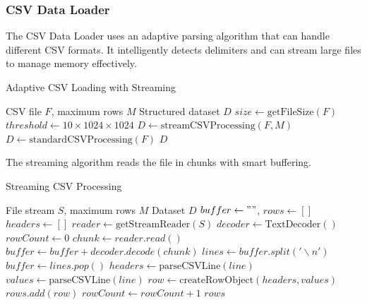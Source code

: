 \documentclass[sigconf]{acmart}
\begin{document}
\subsubsection{CSV Data Loader}

The CSV Data Loader uses an adaptive parsing algorithm that can handle different CSV formats. It intelligently detects delimiters and can stream large files to manage memory effectively.

\begin{algorithm}
\caption{Adaptive CSV Loading with Streaming}
\label{alg:csv-loader}
\begin{algorithmic}[1]
\REQUIRE CSV file $F$, maximum rows $M$
\ENSURE Structured dataset $D$
\STATE $size \leftarrow \text{getFileSize}(F)$
\STATE $threshold \leftarrow 10 \times 1024 \times 1024$
    \STATE $D \leftarrow \text{streamCSVProcessing}(F, M)$
\ELSE
    \STATE $D \leftarrow \text{standardCSVProcessing}(F)$
\ENDIF
\STATE \RETURN $D$
\end{algorithmic}
\end{algorithm}

The streaming algorithm reads the file in chunks with smart buffering.

\begin{algorithm}
\caption{Streaming CSV Processing}
\label{alg:stream-csv}
\begin{algorithmic}[1]
\REQUIRE File stream $S$, maximum rows $M$
\ENSURE Dataset $D$
\STATE $buffer \leftarrow ""$, $rows \leftarrow []$
\STATE $headers \leftarrow []$
\STATE $reader \leftarrow \text{getStreamReader}(S)$
\STATE $decoder \leftarrow \text{TextDecoder}()$
\STATE $rowCount \leftarrow 0$
    \STATE $chunk \leftarrow reader.read()$
    \STATE $buffer \leftarrow buffer + 
    decoder.decode(chunk)$
    \STATE $lines \leftarrow buffer.split('\backslash n')$
    \STATE $buffer \leftarrow lines.pop()$ 
            \STATE $headers \leftarrow 
            \text{parseCSVLine}(line)$
        \ELSE
            \STATE $values \leftarrow 
            \text{parseCSVLine}(line)$
            \STATE $row \leftarrow 
            \text{createRowObject}(headers, values)$
            \STATE $rows.add(row)$
        \ENDIF
        \STATE $rowCount \leftarrow rowCount + 1$
    \ENDFOR
\ENDWHILE
\STATE \RETURN $rows$
\end{algorithmic}
\end{algorithm}
\end{document}
